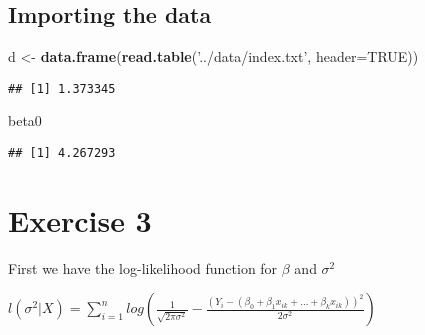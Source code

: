 \documentclass[]{article}
\newenvironment{Shaded}{\begin{snugshade}}{\end{snugshade}}
\newcommand{\DataTypeTok}[1]{\textcolor[rgb]{0.13,0.29,0.53}{#1}}
\newcommand{\KeywordTok}[1]{\textcolor[rgb]{0.13,0.29,0.53}{\textbf{#1}}}
\newcommand{\NormalTok}[1]{#1}
\newcommand{\OperatorTok}[1]{\textcolor[rgb]{0.81,0.36,0.00}{\textbf{#1}}}
\newcommand{\OtherTok}[1]{\textcolor[rgb]{0.56,0.35,0.01}{#1}}
\newcommand{\StringTok}[1]{\textcolor[rgb]{0.31,0.60,0.02}{#1}}
\begin{document}
\hypertarget{importing-the-data}{%
\subsection{Importing the data}\label{importing-the-data}}

\begin{Shaded}
\begin{Highlighting}[]
\NormalTok{d <-}\StringTok{ }\KeywordTok{data.frame}\NormalTok{(}\KeywordTok{read.table}\NormalTok{(}\StringTok{'../data/index.txt'}\NormalTok{, }\DataTypeTok{header=}\OtherTok{TRUE}\NormalTok{))}
\end{Highlighting}
\end{Shaded}

\begin{Shaded}
\end{Shaded}

\begin{verbatim}
## [1] 1.373345
\end{verbatim}

\begin{Shaded}
\begin{Highlighting}[]
\NormalTok{beta0}
\end{Highlighting}
\end{Shaded}

\begin{verbatim}
## [1] 4.267293
\end{verbatim}

\hypertarget{exercise-3}{%
\section{Exercise 3}\label{exercise-3}}

First we have the log-likelihood function for \(\beta\) and
\(\sigma^{2}\)

\(l(\sigma^{2} | X) = \sum_{i=1}^n log(\frac{1}{\sqrt{2 \pi \sigma^{2}}} - \frac{(Y_{i} - (\beta_{0} + \beta_{1} x_{ik} + \dots + \beta_{k} x_{ik}))^{2}}{2 \sigma^{2}})\)
\end{document}
